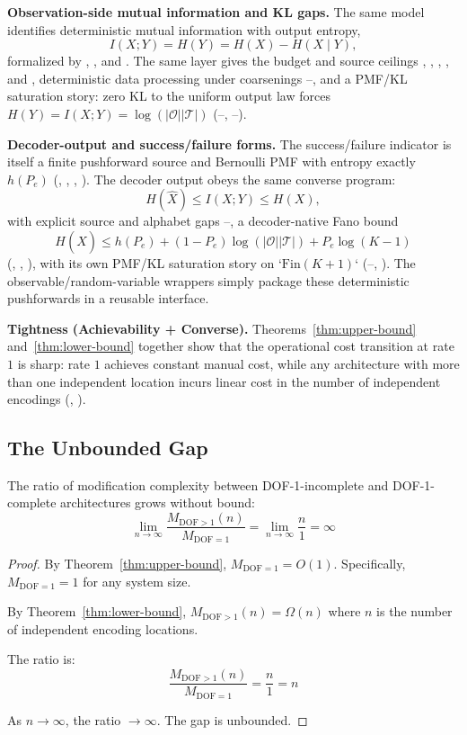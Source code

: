 \textbf{Observation-side mutual information and KL gaps.} The same model identifies deterministic mutual information with output entropy,
\[
I(X;Y)=H(Y)=H(X)-H(X\mid Y),
\]
formalized by , , and . The same layer gives the budget and source ceilings , , , , and , deterministic data processing under coarsenings --, and a PMF/KL saturation story: zero KL to the uniform output law forces $H(Y)=I(X;Y)=\log(|\mathcal O||\mathcal T|)$ (--, --).

\textbf{Decoder-output and success/failure forms.} The success/failure indicator is itself a finite pushforward source and Bernoulli PMF with entropy exactly $h(P_e)$ (, , , ). The decoder output obeys the same converse program:
\[
H(\hat X) \le I(X;Y) \le H(X),
\]
with explicit source and alphabet gaps --, a decoder-native Fano bound
\[
H(\hat X) \le h(P_e) + (1-P_e)\log(|\mathcal O||\mathcal T|) + P_e\log(K-1)
\]
(, , ), with its own PMF/KL saturation story on `$\mathrm{Fin}(K+1)$` (--, ). The observable/random-variable wrappers simply package these deterministic pushforwards in a reusable interface.



\textbf{Tightness (Achievability + Converse).} Theorems~\ref{thm:upper-bound} and~\ref{thm:lower-bound} together show that the operational cost transition at rate $1$ is sharp: rate $1$ achieves constant manual cost, while any architecture with more than one independent location incurs linear cost in the number of independent encodings (, ).

\subsection{The Unbounded Gap}\label{sec:gap}

\begin{theorem}\label{thm:unbounded-gap}
The ratio of modification complexity between DOF-1-incomplete and DOF-1-complete architectures grows without bound:
\[
\lim_{n \to \infty} \frac{M_{\text{DOF}>1}(n)}{M_{\text{DOF}=1}} = \lim_{n \to \infty} \frac{n}{1} = \infty
\]
\end{theorem}

\begin{proof}
By Theorem~\ref{thm:upper-bound}, $M_{\text{DOF}=1} = O(1)$. Specifically, $M_{\text{DOF}=1} = 1$ for any system size.

By Theorem~\ref{thm:lower-bound}, $M_{\text{DOF}>1}(n) = \Omega(n)$ where $n$ is the number of independent encoding locations.

The ratio is:
\[
\frac{M_{\text{DOF}>1}(n)}{M_{\text{DOF}=1}} = \frac{n}{1} = n
\]

As $n \to \infty$, the ratio $\to \infty$. The gap is unbounded.
\end{proof}

